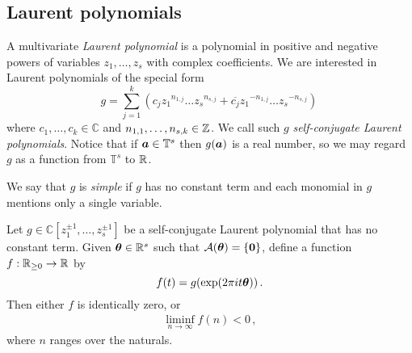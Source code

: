 \subsection{Laurent polynomials}

A multivariate \emph{Laurent polynomial} is a polynomial in positive and negative powers of variables $z_{1}, \ldots, z_{s}$ with complex coefficients. We are interested in Laurent polynomials of the special form
\[ g = \sum_{j=1}^k \left( c_j {z_1}^{n_{1,j}}\ldots {z_s}^{n_{s,j}} +
    \overline{c_j} {z_1}^{-n_{1,j}}\ldots {z_s}^{-n_{s,j}} \right) \,
\]
where $c_1,\ldots,c_k \in \mathbb{C}$ and $n_{1,1},\ldots,n_{s,k} \in \mathbb{Z}$.  We call such $g$ \emph{self-conjugate Laurent polynomials}.  Notice that if $\boldsymbol{a} \in \mathbb{T}^{s}$ then $g(\boldsymbol{a})$ is a real number, so we may regard $g$ as a function from $\mathbb{T}^{s}$ to $\mathbb{R}$.

We say that $g$ is \emph{simple} if $g$ has no constant term and
each monomial in $g$ mentions only a single variable.

\begin{lemma}
\label{lem:first_bound}
Let $g \in \mathbb{C}[z^{\pm 1}_1,\ldots,z^{\pm 1}_s]$ be a self-conjugate Laurent polynomial that has no constant term.
Given $\boldsymbol{\theta} \in \mathbb{R}^{s}$ such that ${\cal{A}}(\boldsymbol{\theta}) = \lbrace \boldsymbol{0} \rbrace$, define a function $f: \mathbb{R}_{\geq 0} \rightarrow \mathbb{R}$ by
\[ f(t) = g(\exp(2 \pi i t \boldsymbol{\theta})) \, .\]
Then either $f$ is identically zero, or
\begin{align*}
\liminf\limits_{n\rightarrow\infty} f(n) < 0 \, ,
\end{align*}
where $n$ ranges over the naturals.
\end{lemma}

